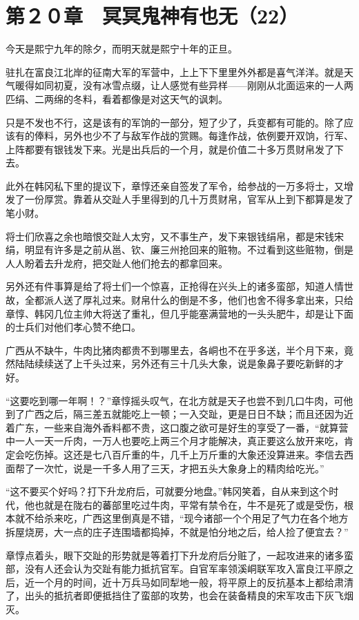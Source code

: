 \section{第２０章　冥冥鬼神有也无（22）}

今天是熙宁九年的除夕，而明天就是熙宁十年的正旦。

驻扎在富良江北岸的征南大军的军营中，上上下下里里外外都是喜气洋洋。就是天气暖得如同初夏，没有冰雪点缀，让人感觉有些异样——刚刚从北面运来的一人两匹绢、二两绵的冬料，看着都像是对这天气的讽刺。

只是不发也不行，这是该有的军饷的一部分，短了少了，兵变都有可能的。除了应该有的俸料，另外也少不了与敌军作战的赏赐。每逢作战，依例要开双饷，行军、上阵都要有银钱发下来。光是出兵后的一个月，就是价值二十多万贯财帛发了下去。

此外在韩冈私下里的提议下，章惇还亲自签发了军令，给参战的一万多将士，又增发了一份厚赏。靠着从交趾人手里得到的几十万贯财帛，官军从上到下都算是发了笔小财。

将士们欣喜之余也暗恨交趾人太穷，又不事生产，发下来银钱绢帛，都是宋钱宋绢，明显有许多是之前从邕、钦、廉三州抢回来的赃物。不过看到这些赃物，倒是人人盼着去升龙府，把交趾人他们抢去的都拿回来。

另外还有件事算是给了将士们一个惊喜，正抢得在兴头上的诸多蛮部，知道人情世故，全都派人送了厚礼过来。财帛什么的倒是不多，他们也舍不得多拿出来，只给章惇、韩冈几位主帅大将送了重礼，但几乎能塞满营地的一头头肥牛，却是让下面的士兵们对他们孝心赞不绝口。

广西从不缺牛，牛肉比猪肉都贵不到哪里去，各峒也不在乎多送，半个月下来，竟然陆陆续续送了上千头过来，另外还有三十几头大象，说是象鼻子要吃新鲜的才好。

“这要吃到哪一年啊！？”章惇摇头叹气，在北方就是天子也尝不到几口牛肉，可他到了广西之后，隔三差五就能吃上一顿；一入交趾，更是日日不缺；而且还因为近着广东，一些来自海外香料都不贵，这口腹之欲可是好生的享受了一番，“就算营中一人一天一斤肉，一万人也要吃上两三个月才能解决，真正要这么放开来吃，肯定会吃伤掉。这还是七八百斤重的牛，几千上万斤重的大象还没算进来。李信去西面帮了一次忙，说是一千多人用了三天，才把五头大象身上的精肉给吃光。”

“这不要买个好吗？打下升龙府后，可就要分地盘。”韩冈笑着，自从来到这个时代，他也就是在陇右的蕃部里吃过牛肉，平常有禁令在，牛不是死了或是受伤，根本就不给杀来吃，广西这里倒真是不错，“现今诸部一个个用足了气力在各个地方拆屋烧房，大一点的庄子连围墙都捣掉，不就是怕分地之后，给人捡了便宜去？”

章惇点着头，眼下交趾的形势就是等着打下升龙府后分赃了，一起攻进来的诸多蛮部，没有人还会认为交趾有能力抵抗官军。自官军率领溪峒联军攻入富良江平原之后，近一个月的时间，近十万兵马如同犁地一般，将平原上的反抗基本上都给肃清了，出头的抵抗者即便抵挡住了蛮部的攻势，也会在装备精良的宋军攻击下灰飞烟灭。

